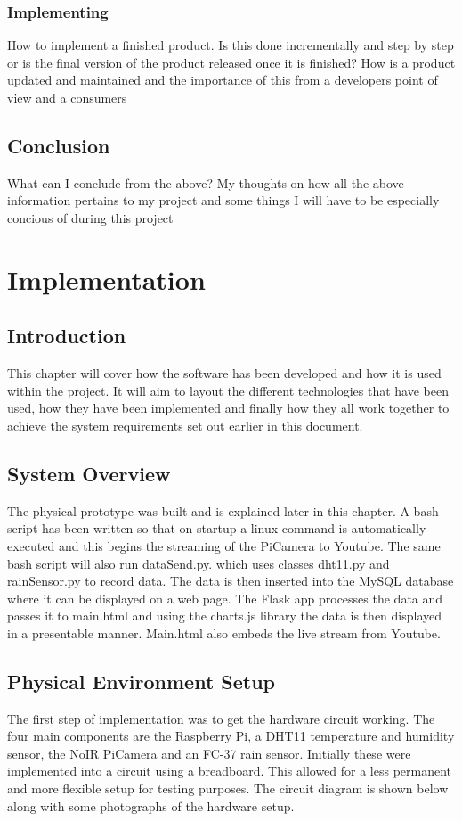 \documentclass[10pt,a4paper]{article}
\begin{document}
\subsubsection{Implementing}
How to implement a finished product. Is this done incrementally and step by step or is the final version of the product released once it is finished? How is a product updated and maintained and the importance of this from a developers point of view and a consumers



\subsection{Conclusion}
What can I conclude from the above? My thoughts on how all the above information pertains to my project and some things I will have to be especially concious of during this project 

\section{Implementation} 
\subsection{Introduction}
This chapter will cover how the software has been developed and how it is used within the project. It will aim to layout the different technologies that have been used, how they have been implemented and finally how they all work together to achieve the system requirements set out earlier in this document.

\subsection{System Overview}
The physical prototype was built and is explained later in this chapter. A bash script has been written so that on startup a linux command is automatically executed and this begins the streaming of the PiCamera to Youtube. The same bash script will also run dataSend.py. which uses classes dht11.py and rainSensor.py to record data. The data is then inserted into the MySQL database where it can be displayed on a web page. The Flask app processes the data and passes it to main.html and using the charts.js library the data is then displayed in a presentable manner. Main.html also embeds the live stream from Youtube. 

\subsection{Physical Environment Setup}
The first step of implementation was to get the hardware circuit working. The four main components are the Raspberry Pi, a DHT11 temperature and humidity sensor, the NoIR PiCamera and an FC-37 rain sensor. Initially these were implemented into a circuit using a breadboard. This allowed for a less permanent and more flexible setup for testing purposes. The circuit diagram is shown below along with some photographs of the hardware setup. 
\end{document}

